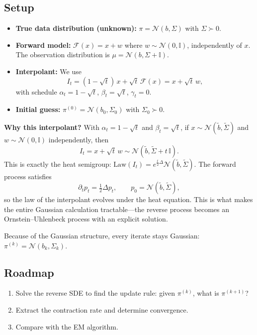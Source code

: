 \documentclass[12pt,fleqn]{article}
\numberwithin{equation}{section}
\newcommand{\N}{\mathcal{N}}
\newcommand{\I}{\mathbb{I}}
\newcommand{\Law}{\mathrm{Law}}
\begin{document}
\subsection{Setup}

\begin{itemize}
    \item \textbf{True data distribution (unknown):} $\pi = \N(b, \Sigma)$ with $\Sigma \succ 0$.
    \item \textbf{Forward model:} $\mathcal F(x) = x + w$ where $w \sim \N(0, \I)$, independently of $x$. The observation distribution is $\mu = \N(b, \Sigma + \I)$.
    \item \textbf{Interpolant:} We use 
    \begin{equation}
        I_t = (1-\sqrt{t})\,x + \sqrt{t}\,\mathcal F(x) = x + \sqrt{t}\,w, \label{eq:gaussinterp}
    \end{equation}
    with schedule $\alpha_t = 1-\sqrt{t}$, $\beta_t = \sqrt{t}$, $\gamma_t = 0$.
    \item \textbf{Initial guess:} $\pi^{(0)} = \N(b_0, \Sigma_0)$ with $\Sigma_0 \succ 0$.
\end{itemize}

\begin{sidework}
\noindent\textbf{Why this interpolant?} With $\alpha_t = 1-\sqrt{t}$ and $\beta_t = \sqrt{t}$, if $x \sim \N(\tilde b, \tilde \Sigma)$ and $w \sim \N(0,\I)$ independently, then
\[
	I_t = x + \sqrt{t}\, w \sim \N(\tilde b, \tilde\Sigma + t\,\I).
\]
This is exactly the heat semigroup: $\Law(I_t) = e^{\frac{t}{2}\Delta} \N(\tilde b, \tilde\Sigma)$. The forward process satisfies
\[
	\partial_t p_t = \tfrac{1}{2} \Delta p_t, \qquad p_0 = \N(\tilde b, \tilde\Sigma),
\]
so the law of the interpolant evolves under the heat equation. This is what makes the entire Gaussian calculation tractable---the reverse process becomes an Ornstein--Uhlenbeck process with an explicit solution.
\end{sidework}

\noindent Because of the Gaussian structure, every iterate stays Gaussian: $\pi^{(k)} = \N(b_k, \Sigma_k)$.

\subsection{Roadmap}
\begin{enumerate}
    \item Solve the reverse SDE to find the update rule: given $\pi^{(k)}$, what is $\pi^{(k+1)}$?
    \item Extract the contraction rate and determine convergence.
    \item Compare with the EM algorithm.
\end{enumerate}
\end{document}
